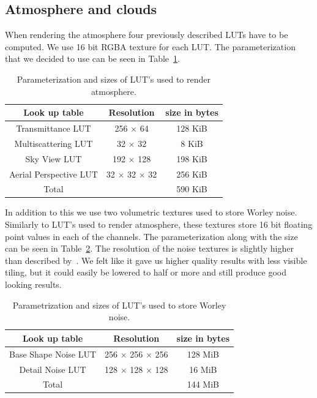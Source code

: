 \documentclass{ctuthesis}
\begin{document}
\subsection{Atmosphere and clouds}
When rendering the atmosphere four previously described LUTs have to be computed. We use 16 bit RGBA texture
for each LUT. The parameterization that we decided to use can be seen in Table~\ref{tab:Atmosphere LUT}. 
\begin{center}
\begin{table}[H]
\begin{tabular}{ ||c|c|c|| } 
\hline
Look up table & Resolution & size in bytes \\
\hline
Transmittance LUT & 256 $\times$ 64 & 128 KiB \\
\hline
Multiscattering LUT & 32 $\times$ 32 & 8 KiB \\
\hline 
Sky View LUT & 192 $\times$ 128 & 198 KiB \\
\hline
Aerial Perspective LUT & 32 $\times$ 32 $\times$ 32 & 256 KiB \\
\hline
Total & & 590 KiB \\
\hline
\end{tabular}
\caption[Atmosphere LUT sizes]{\label{tab:Atmosphere LUT} Parameterization and sizes of LUT's used to render atmosphere.}
\end{table}
\end{center}

In addition to this we use two volumetric textures used to store Worley noise. Similarly to LUT's used to render atmosphere,
these textures store 16 bit floating point values in each of the channels. The parameterization along with the size can be seen 
in Table~\ref{tab:Noise LUT}. The resolution of the noise textures is slightly higher than described by~\cite{schneider2015real}.
We felt like it gave us higher quality results with less visible tiling, but it could easily be lowered to half or more and
still produce good looking results. 
\begin{center}
\begin{table}[h]
\begin{tabular}{ ||c|c|c|| } 
\hline
Look up table & Resolution & size in bytes \\
\hline
Base Shape Noise LUT & 256 $\times$ 256 $\times$ 256 & 128 MiB \\
\hline
Detail Noise LUT & 128 $\times$ 128 $\times$ 128 & 16 MiB \\
\hline 
Total & & 144 MiB \\
\hline
\end{tabular}
\caption[Clouds Noise LUT sizes]{\label{tab:Noise LUT} Parametrization and sizes of LUT's used to store Worley noise.}
\end{table}
\end{center}
\end{document}
